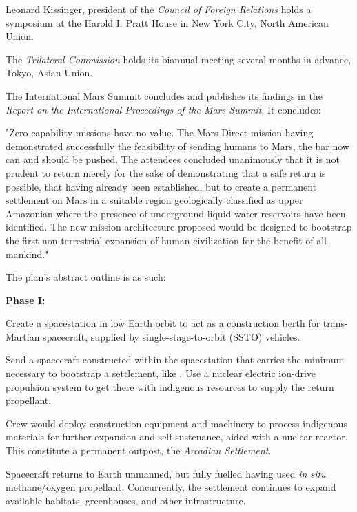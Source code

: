 Leonard Kissinger, president of the {\it Council of Foreign Relations} holds a symposium at the Harold I. Pratt House in New York City, North American Union.
\StopTimelineDate

The {\it Trilateral Commission} holds its biannual meeting several months in advance, Tokyo, Asian Union.
\StopTimelineDate

The International Mars Summit concludes and publishes its findings in the {\it Report on the International Proceedings of the Mars Summit}. It concludes:
\crlf

\startTimelineDocument
"Zero capability missions have no value. The Mars Direct mission having demonstrated successfully the feasibility of sending humans to Mars, the bar now can and should be pushed. The attendees concluded unanimously that it is not prudent to return merely for the sake of demonstrating that a safe return is possible, that having already been established, but to create a permanent settlement on Mars in a suitable region geologically classified as upper Amazonian where the presence of underground liquid water reservoirs have been identified. The new mission architecture proposed would be designed to bootstrap the first non-terrestrial expansion of human civilization for the benefit of all mankind."
\stopTimelineDocument
\crlf

The plan's abstract outline is as such:

{\bf Phase I:} 

\startitemize[n]
\item Create a spacestation in low Earth orbit to act as a construction berth for trans-Martian spacecraft, supplied by single-stage-to-orbit (SSTO) vehicles.

\item Send a spacecraft constructed within the spacestation that carries the minimum necessary to bootstrap a settlement, like . Use a nuclear electric ion-drive propulsion system to get there with indigenous resources to supply the return propellant. 

\item Crew would deploy construction equipment and machinery to process indigenous materials for further expansion and self sustenance, aided with a nuclear reactor. This constitute a permanent outpost, the {\it Arcadian Settlement}.

\item Spacecraft returns to Earth unmanned, but fully fuelled having used {\it in situ} methane/oxygen propellant. Concurrently, the settlement continues to expand available habitats, greenhouses, and other infrastructure.
\stopitemize

